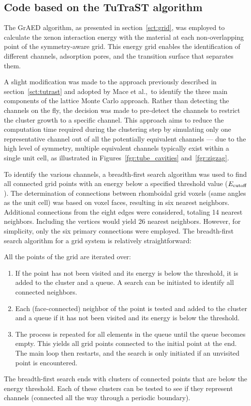 \documentclass[main]{subfiles}
\begin{document}
\subsection{Code based on the TuTraST algorithm}

The GrAED algorithm, as presented in section~\ref{sct:grid}, was employed to calculate the xenon interaction energy with the material at each non-overlapping point of the symmetry-aware grid. This energy grid enables the identification of different channels, adsorption pores, and the transition surface that separates them.

A slight modification was made to the approach previously described in section~\ref{sct:tutrast} and adopted by Mace et al.,\ to identify the three main components of the lattice Monte Carlo approach. Rather than detecting the channels on the fly, the decision was made to pre-detect the channels to restrict the cluster growth to a specific channel. This approach aims to reduce the computation time required during the clustering step by simulating only one representative channel out of all the potentially equivalent channels --- due to the high level of symmetry, multiple equivalent channels typically exist within a single unit cell, as illustrated in Figures~\ref{fgr:tube_cavities} and~\ref{fgr:zigzag}.

To identify the various channels, a breadth-first search algorithm was used to find all connected grid points with an energy below a specified threshold value ($E_{\text{cutoff}}$). The determination of connections between rhomboidal grid voxels (same angles as the unit cell) was based on voxel faces, resulting in six nearest neighbors. Additional connections from the eight edges were considered, totaling 14 nearest neighbors. Including the vertices would yield 26 nearest neighbors. However, for simplicity, only the six primary connections were employed. The breadth-first search algorithm for a grid system is relatively straightforward:

All the points of the grid are iterated over:
  \begin{enumerate}
    \item If the point has not been visited and its energy is below the threshold, it is added to the cluster and a queue. A search can be initiated to identify all connected neighbors.
    \item Each (face-connected) neighbor of the point is tested and added to the cluster and a queue if it has not been visited and its energy is below the threshold.
    \item The process is repeated for all elements in the queue until the queue becomes empty. This yields all grid points connected to the initial point at the end. The main loop then restarts, and the search is only initiated if an unvisited point is encountered.
  \end{enumerate}
The breadth-first search ends with clusters of connected points that are below the energy threshold. Each of these clusters can be tested to see if they represent channels (connected all the way through a periodic boundary).
\end{document}
